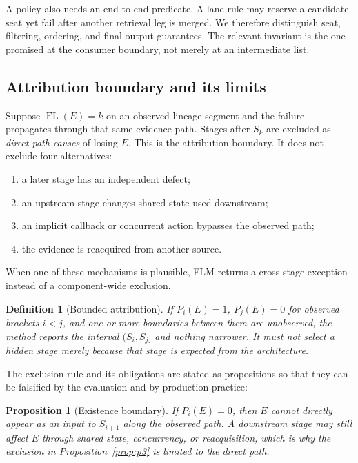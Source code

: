 \documentclass[10pt]{article}
\newtheorem{definition}{Definition}
\newtheorem{proposition}{Proposition}
\newcommand{\FL}{\operatorname{FL}}
\begin{document}
A policy also needs an end-to-end predicate. A lane rule may reserve a candidate seat yet fail after another retrieval leg is merged. We therefore distinguish seat, filtering, ordering, and final-output guarantees. The relevant invariant is the one promised at the consumer boundary, not merely at an intermediate list.

\subsection{Attribution boundary and its limits}

Suppose $\FL(E)=k$ on an observed lineage segment and the failure propagates through that same evidence path. Stages after $S_k$ are excluded as \emph{direct-path causes} of losing $E$. This is the attribution boundary. It does not exclude four alternatives:
\begin{enumerate}[leftmargin=*]
  \item a later stage has an independent defect;
  \item an upstream stage changes shared state used downstream;
  \item an implicit callback or concurrent action bypasses the observed path;
  \item the evidence is reacquired from another source.
\end{enumerate}
When one of these mechanisms is plausible, FLM returns a cross-stage exception instead of a component-wide exclusion.

\begin{definition}[Bounded attribution]\label{def:bounded}
If $P_i(E)=1$, $P_j(E)=0$ for observed brackets $i<j$, and one or more boundaries between them are unobserved, the method reports the interval $(S_i,S_j]$ and nothing narrower. It must not select a hidden stage merely because that stage is expected from the architecture.
\end{definition}

The exclusion rule and its obligations are stated as propositions so that they can be falsified by the evaluation and by production practice:

\begin{proposition}[Existence boundary]\label{prop:p1}
If $P_i(E)=0$, then $E$ cannot directly appear as an input to $S_{i+1}$ along the observed path. A downstream stage may still affect $E$ through shared state, concurrency, or reacquisition, which is why the exclusion in Proposition~\ref{prop:p3} is limited to the direct path.
\end{proposition}
\end{document}
